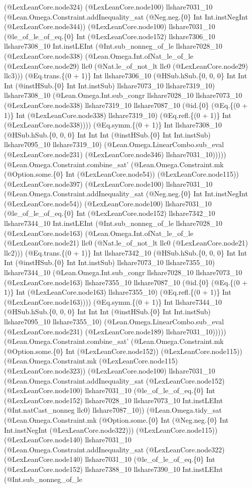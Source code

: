 \documentclass[11pt]{article}
\begin{document}
(@LexLeanCore.node324) (@LexLeanCore.node100) llshare7031\_10 (@Lean.Omega.Constraint.addInequality\_sat (@Neg.neg.\{0\} Int Int.instNegInt (@LexLeanCore.node344)) (@LexLeanCore.node100) llshare7031\_10 (@le\_of\_le\_of\_eq.\{0\} Int (@LexLeanCore.node152) llshare7306\_10 llshare7308\_10 Int.instLEInt (@Int.sub\_nonneg\_of\_le llshare7028\_10 (@LexLeanCore.node338) (@Lean.Omega.Int.ofNat\_le\_of\_le (@LexLeanCore.node29) llc0 (@Nat.le\_of\_not\_lt llc0 (@LexLeanCore.node29) llc3))) (@Eq.trans.\{(0 + 1)\} Int llshare7306\_10 (@HSub.hSub.\{0, 0, 0\} Int Int Int (@instHSub.\{0\} Int Int.instSub) llshare7073\_10 llshare7319\_10) llshare7308\_10 (@Lean.Omega.Int.sub\_congr llshare7028\_10 llshare7073\_10 (@LexLeanCore.node338) llshare7319\_10 llshare7087\_10 (@id.\{0\} (@Eq.\{(0 + 1)\} Int (@LexLeanCore.node338) llshare7319\_10) (@Eq.refl.\{(0 + 1)\} Int (@LexLeanCore.node338)))) (@Eq.symm.\{(0 + 1)\} Int llshare7308\_10 (@HSub.hSub.\{0, 0, 0\} Int Int Int (@instHSub.\{0\} Int Int.instSub) llshare7095\_10 llshare7319\_10) (@Lean.Omega.LinearCombo.sub\_eval (@LexLeanCore.node231) (@LexLeanCore.node346) llshare7031\_10))))) (@Lean.Omega.Constraint.combine\_sat' (@Lean.Omega.Constraint.mk (@Option.some.\{0\} Int (@LexLeanCore.node54)) (@LexLeanCore.node115)) (@LexLeanCore.node397) (@LexLeanCore.node100) llshare7031\_10 (@Lean.Omega.Constraint.addInequality\_sat (@Neg.neg.\{0\} Int Int.instNegInt (@LexLeanCore.node54)) (@LexLeanCore.node100) llshare7031\_10 (@le\_of\_le\_of\_eq.\{0\} Int (@LexLeanCore.node152) llshare7342\_10 llshare7344\_10 Int.instLEInt (@Int.sub\_nonneg\_of\_le llshare7028\_10 (@LexLeanCore.node163) (@Lean.Omega.Int.ofNat\_le\_of\_le (@LexLeanCore.node21) llc0 (@Nat.le\_of\_not\_lt llc0 (@LexLeanCore.node21) llc2))) (@Eq.trans.\{(0 + 1)\} Int llshare7342\_10 (@HSub.hSub.\{0, 0, 0\} Int Int Int (@instHSub.\{0\} Int Int.instSub) llshare7073\_10 llshare7355\_10) llshare7344\_10 (@Lean.Omega.Int.sub\_congr llshare7028\_10 llshare7073\_10 (@LexLeanCore.node163) llshare7355\_10 llshare7087\_10 (@id.\{0\} (@Eq.\{(0 + 1)\} Int (@LexLeanCore.node163) llshare7355\_10) (@Eq.refl.\{(0 + 1)\} Int (@LexLeanCore.node163)))) (@Eq.symm.\{(0 + 1)\} Int llshare7344\_10 (@HSub.hSub.\{0, 0, 0\} Int Int Int (@instHSub.\{0\} Int Int.instSub) llshare7095\_10 llshare7355\_10) (@Lean.Omega.LinearCombo.sub\_eval (@LexLeanCore.node231) (@LexLeanCore.node189) llshare7031\_10))))) (@Lean.Omega.Constraint.combine\_sat' (@Lean.Omega.Constraint.mk (@Option.some.\{0\} Int (@LexLeanCore.node152)) (@LexLeanCore.node115)) (@Lean.Omega.Constraint.mk (@LexLeanCore.node115) (@LexLeanCore.node323)) (@LexLeanCore.node100) llshare7031\_10 (@Lean.Omega.Constraint.addInequality\_sat (@LexLeanCore.node152) (@LexLeanCore.node100) llshare7031\_10 (@le\_of\_le\_of\_eq.\{0\} Int (@LexLeanCore.node152) llshare7028\_10 llshare7073\_10 Int.instLEInt (@Int.natCast\_nonneg llc0) llshare7087\_10)) (@Lean.Omega.tidy\_sat (@Lean.Omega.Constraint.mk (@Option.some.\{0\} Int (@Neg.neg.\{0\} Int Int.instNegInt (@LexLeanCore.node322))) (@LexLeanCore.node115)) (@LexLeanCore.node140) llshare7031\_10 (@Lean.Omega.Constraint.addInequality\_sat (@LexLeanCore.node322) (@LexLeanCore.node140) llshare7031\_10 (@le\_of\_le\_of\_eq.\{0\} Int (@LexLeanCore.node152) llshare7388\_10 llshare7390\_10 Int.instLEInt (@Int.sub\_nonneg\_of\_le 
\end{document}
